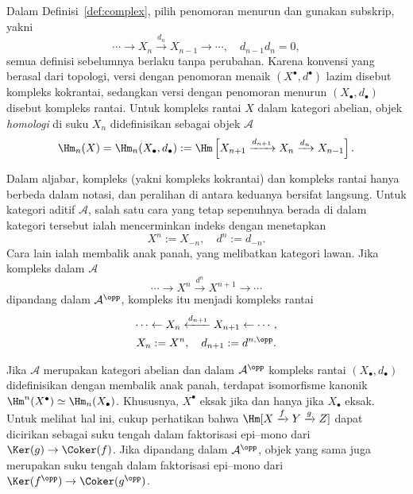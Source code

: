 \begin{catatan}\label{rem:cochain-vs-chain}
	Dalam Definisi~\ref{def:complex}, pilih penomoran menurun dan gunakan
	subskrip, yakni
	\[ \cdots \to X_n \xrightarrow{d_n} X_{n-1} \to \cdots, \quad d_{n-1} d_n = 0, \]
	semua definisi sebelumnya berlaku tanpa perubahan. Karena konvensi yang
	berasal dari topologi, versi dengan penomoran menaik $(X^\bullet, d^\bullet)$ lazim
	disebut kompleks kokrantai, sedangkan versi dengan penomoran menurun
	$(X_\bullet, d_\bullet)$ disebut kompleks rantai. Untuk kompleks rantai $X$
	dalam kategori abelian, objek
	\emph{homologi} di suku $X_n$ didefinisikan sebagai objek $\mathcal{A}$
	\[ \Hm_n(X) = \Hm_n(X_\bullet, d_\bullet) := \Hm\left[ X_{n+1} \xrightarrow{d_{n+1}} X_n \xrightarrow{d_n} X_{n-1} \right]. \]

	Dalam aljabar, kompleks (yakni kompleks kokrantai) dan kompleks rantai hanya
	berbeda dalam notasi, dan peralihan di antara keduanya bersifat langsung.
	Untuk kategori aditif $\mathcal{A}$, salah satu cara yang tetap sepenuhnya
	berada di dalam kategori tersebut ialah mencerminkan indeks dengan
	menetapkan
	\[ X^n := X_{-n}, \quad d^n := d_{-n}. \]
	Cara lain ialah membalik anak panah, yang melibatkan kategori lawan. Jika
	kompleks dalam $\mathcal{A}$
	\[ \cdots \to X^n \xrightarrow{d^n} X^{n+1} \to \cdots \]
	dipandang dalam $\mathcal{A}^{\opp}$, kompleks itu menjadi kompleks rantai
	\begin{gather*}
		\cdots \leftarrow X_n \xleftarrow{d_{n+1}} X_{n+1} \leftarrow \cdots, \\
		X_n := X^n, \quad d_{n+1} := d^{n, \opp}.
	\end{gather*}

	Jika $\mathcal{A}$ merupakan kategori abelian dan dalam
	$\mathcal{A}^{\opp}$ kompleks rantai $(X_\bullet, d_\bullet)$ didefinisikan
	dengan membalik anak panah, terdapat isomorfisme kanonik
	$\Hm^n(X^\bullet) \simeq \Hm_n(X_\bullet)$. Khususnya, $X^\bullet$ eksak
	jika dan hanya jika $X_\bullet$ eksak. Untuk melihat hal ini, cukup perhatikan
	bahwa $\Hm[X \xrightarrow{f} Y \xrightarrow{g} Z]$ dapat dicirikan sebagai
	suku tengah dalam faktorisasi epi--mono dari
	$\Ker(g) \to \Coker(f)$. Jika dipandang dalam $\mathcal{A}^{\opp}$, objek
	yang sama juga merupakan suku tengah dalam faktorisasi epi--mono dari
	$\Ker(f^{\opp}) \to \Coker(g^{\opp})$.
\end{catatan}

